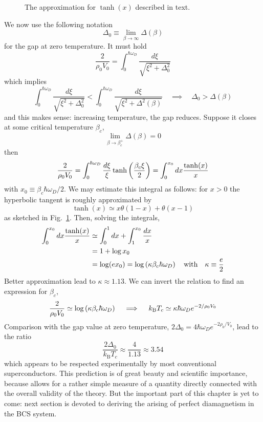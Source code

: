 \begin{figure}
	\centering
	
	\caption{The approximation for $\tanh(x)$ described in text.}
	\label{fig:hyperbolic tangent approximation}
\end{figure}

We now use the following notation
\[
	\Delta_0 \equiv \lim_{\beta\to\infty} \Delta(\beta)
\]
for the gap at zero temperature. It must hold
\[
	\frac{2}{\rho_0 V_0} = \int_0^{\hbar\omega_D} \frac{d\xi}{\displaystyle \sqrt{\xi^2 + \Delta_0^2}}
\]
which implies
\[
	\int_0^{\hbar\omega_D} \frac{d\xi}{\displaystyle \sqrt{\xi^2 + \Delta_0^2}} < \int_0^{\hbar\omega_D} \frac{d\xi}{\displaystyle \sqrt{\xi^2 + \Delta^2 (\beta)}}
	\quad\implies\quad
	\Delta_0 > \Delta (\beta)
\]
and this makes sense: increasing temperature, the gap reduces. Suppose it closes at some critical temperature $\beta_c$,
\[
	\lim_{\beta\to\beta_c^+} \Delta (\beta) = 0
\]
then
\[
	\frac{2}{\rho_0 V_0} = \int_0^{\hbar\omega_D} \frac{d\xi}{\xi} \tanh \left({ \frac{\beta_c \xi}{2} }\right) = \int_0^{x_0} dx \frac{\tanh(x)}{x}
\]
with $x_0 \equiv \beta_c \hbar\omega_D/2$. We may estimate this integral as follows: for $x>0$ the hyperbolic tangent is roughly approximated by
\[
	\tanh(x) \simeq x \theta(1-x) + \theta(x-1)
\]
as sketched in Fig.~\ref{fig:hyperbolic tangent approximation}. Then, solving the integrals,
\[
\begin{aligned}
	\int_0^{x_0} dx \frac{\tanh(x)}{x} &\simeq \int_0^1 dx + \int_1^{x_0} \frac{dx}{x} \\
	&= 1 + \log x_0\\
	&= \log(e x_0) = \log\lrR{\kappa \beta_c \hbar\omega_D}
	\qq{with} \kappa \equiv \frac{e}{2}
\end{aligned}
\]
Better approximation lead to $\kappa \approx 1.13$. We can invert the relation to find an expression for $\beta_c$,
\[
	\frac{2}{\rho_0 V_0} \simeq \log\left({\kappa \beta_c \hbar\omega_D}\right)
	\quad\implies\quad
	k_\mathrm{B} T_c \simeq \kappa \hbar\omega_D e^{-2/\rho_0 V_0}
\]
Comparison with the gap value at zero temperature, $2\Delta_0 = 4\hbar\omega_D e^{-2\rho_0/V_0}$, lead to the ratio
\[
	\frac{2\Delta_0}{k_\mathrm{B} T_c} \approx \frac{4}{1.13} \approx 3.54
\]
which appears to be respected experimentally by most conventional superconductors. This prediction is of great beauty and scientific importance, because allows for a rather simple measure of a quantity directly connected with the overall validity of the theory. But the important part of this chapter is yet to come: next section is devoted to deriving the arising of perfect diamagnetism in the BCS system.

